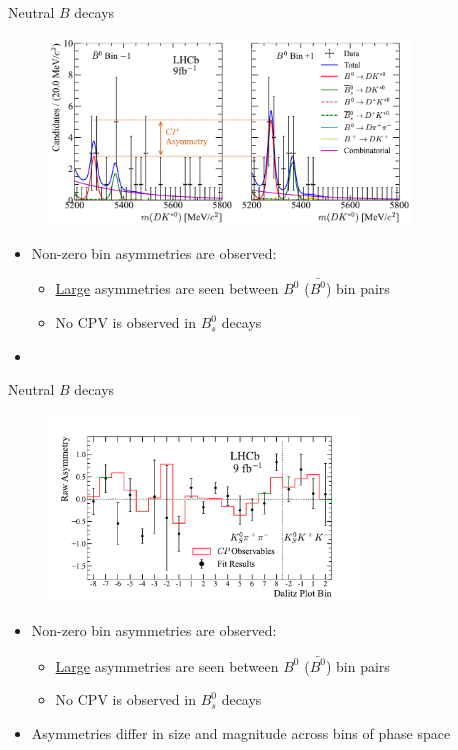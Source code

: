 \documentclass[xcolor={dvipsnames}]{beamer}
\begin{document}
\begin{frame}{Neutral $B$ decays}
  \begin{figure}
    \includegraphics[height = 5.0cm]{Plots/CPFitAsymmetry_B0toDKst.pdf}
  \end{figure}
  \begin{itemize}
    \setlength\itemsep{0.5em}
    \item{Non-zero bin asymmetries are observed:}
    \begin{itemize}
      \item{\underline{Large} asymmetries are seen between $B^0$ ($\bar{B^0}$) bin pairs}
      \item{No CPV is observed in $B^0_s$ decays}
    \end{itemize}
    \item[]{\phantom{Asymmetries differ in size and magnitude across bins of phase space}}
  \end{itemize}
\end{frame}

\begin{frame}{Neutral $B$ decays}
  \begin{figure}
    \includegraphics[height = 5.0cm]{Plots/Asymmetry_B0toDKst.pdf}
  \end{figure}
  \begin{itemize}
    \setlength\itemsep{0.5em}
    \item{Non-zero bin asymmetries are observed:}
    \begin{itemize}
      \item{\underline{Large} asymmetries are seen between $B^0$ ($\bar{B^0}$) bin pairs}
      \item{No CPV is observed in $B^0_s$ decays}
    \end{itemize}
    \item{Asymmetries differ in size and magnitude across bins of phase space}
  \end{itemize}
\end{frame}
\end{document}
